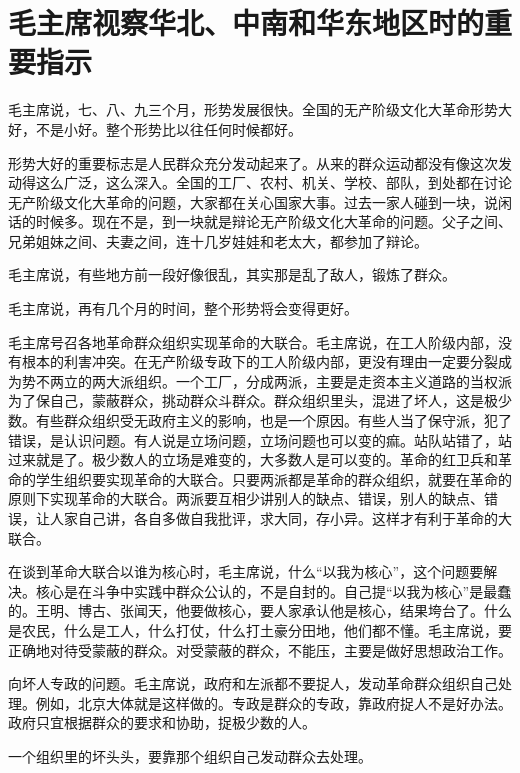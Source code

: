 \section[毛主席视察华北、中南和华东地区时的重要指示 ]{毛主席视察华北、中南和华东地区时的重要指示 }


毛主席说，七、八、九三个月，形势发展很快。全国的无产阶级文化大革命形势大好，不是小好。整个形势比以往任何时候都好。

形势大好的重要标志是人民群众充分发动起来了。从来的群众运动都没有像这次发动得这么广泛，这么深入。全国的工厂、农村、机关、学校、部队，到处都在讨论无产阶级文化大革命的问题，大家都在关心国家大事。过去一家人碰到一块，说闲话的时候多。现在不是，到一块就是辩论无产阶级文化大革命的问题。父子之间、兄弟姐妹之间、夫妻之间，连十几岁娃娃和老太大，都参加了辩论。

毛主席说，有些地方前一段好像很乱，其实那是乱了敌人，锻炼了群众。

毛主席说，再有几个月的时间，整个形势将会变得更好。

毛主席号召各地革命群众组织实现革命的大联合。毛主席说，在工人阶级内部，没有根本的利害冲突。在无产阶级专政下的工人阶级内部，更没有理由一定要分裂成为势不两立的两大派组织。一个工厂，分成两派，主要是走资本主义道路的当权派为了保自己，蒙蔽群众，挑动群众斗群众。群众组织里头，混进了坏人，这是极少数。有些群众组织受无政府主义的影响，也是一个原因。有些人当了保守派，犯了错误，是认识问题。有人说是立场问题，立场问题也可以变的痲。站队站错了，站过来就是了。极少数人的立场是难变的，大多数人是可以变的。革命的红卫兵和革命的学生组织要实现革命的大联合。只要两派都是革命的群众组织，就要在革命的原则下实现革命的大联合。两派要互相少讲别人的缺点、错误，别人的缺点、错误，让人家自己讲，各自多做自我批评，求大同，存小异。这样才有利于革命的大联合。

在谈到革命大联合以谁为核心时，毛主席说，什么“以我为核心”，这个问题要解决。核心是在斗争中实践中群众公认的，不是自封的。自己提“以我为核心”是最蠢的。王明、博古、张闻天，他要做核心，要人家承认他是核心，结果垮台了。什么是农民，什么是工人，什么打仗，什么打土豪分田地，他们都不懂。毛主席说，要正确地对待受蒙蔽的群众。对受蒙蔽的群众，不能压，主要是做好思想政治工作。

向坏人专政的问题。毛主席说，政府和左派都不要捉人，发动革命群众组织自己处理。例如，北京大体就是这样做的。专政是群众的专政，靠政府捉人不是好办法。政府只宜根据群众的要求和协助，捉极少数的人。

一个组织里的坏头头，要靠那个组织自己发动群众去处理。

